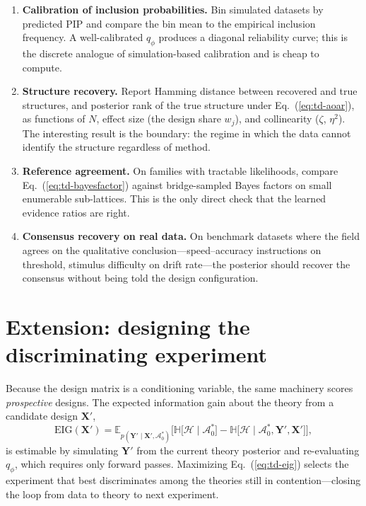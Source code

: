 \documentclass[11pt]{article}
\newcommand{\rmX}{\mathbf{X}}
\newcommand{\rmY}{\mathbf{Y}}
\providecommand{\cref}[1]{Eq.~(\ref{#1})}
\begin{document}
\begin{enumerate}
\item \textbf{Calibration of inclusion probabilities.} Bin simulated datasets by
predicted PIP and compare the bin mean to the empirical inclusion frequency. A
well-calibrated $q_\phi$ produces a diagonal reliability curve; this is the discrete
analogue of simulation-based calibration and is cheap to compute.
\item \textbf{Structure recovery.} Report Hamming distance between recovered and true
structures, and posterior rank of the true structure under \cref{eq:td-aoar}, as
functions of $N$, effect size (the design share $w_j$), and collinearity ($\zeta$,
$\eta^2$). The interesting result is the boundary: the regime in which the data cannot
identify the structure regardless of method.
\item \textbf{Reference agreement.} On families with tractable likelihoods, compare
\cref{eq:td-bayesfactor} against bridge-sampled Bayes factors on small enumerable
sub-lattices. This is the only direct check that the learned evidence ratios are right.
\item \textbf{Consensus recovery on real data.} On benchmark datasets where the field
agrees on the qualitative conclusion---speed--accuracy instructions on threshold,
stimulus difficulty on drift rate---the posterior should recover the consensus without
being told the design configuration.
\end{enumerate}

\section{Extension: designing the discriminating experiment}

Because the design matrix is a conditioning variable, the same machinery scores
\emph{prospective} designs. The expected information gain about the theory from a
candidate design $\rmX'$,
%
\begin{equation}
\label{eq:td-eig}
\mathrm{EIG}(\rmX') = \mathbb{E}_{p(\rmY' \mid \rmX', \mathcal{A}_0^\ast)}
\Big[ \mathbb{H}\big[\mathcal{H} \mid \mathcal{A}_0^\ast\big]
- \mathbb{H}\big[\mathcal{H} \mid \mathcal{A}_0^\ast, \rmY', \rmX'\big] \Big],
\end{equation}
%
is estimable by simulating $\rmY'$ from the current theory posterior and re-evaluating
$q_\phi$, which requires only forward passes. Maximizing \cref{eq:td-eig} selects the
experiment that best discriminates among the theories still in contention---closing the
loop from data to theory to next experiment.
\end{document}
